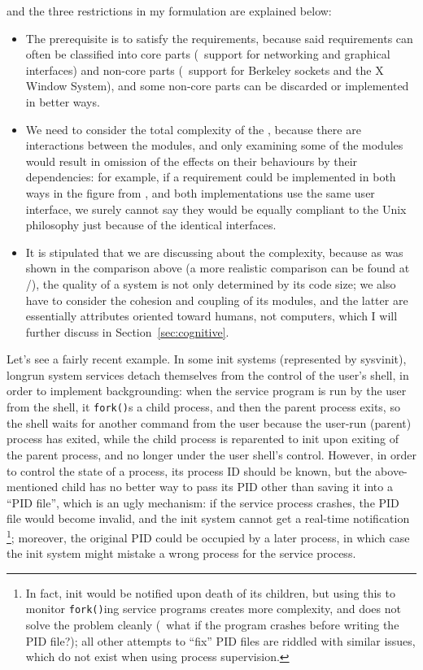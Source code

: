 and the three restrictions in my formulation are explained below:
\begin{itemize}
\item The prerequisite is to  satisfy the requirements,
	because said requirements can often be classified into core parts
	(\eg~support for networking and graphical interfaces) and non-core
	parts (\eg~support for Berkeley sockets and the X Window System),
	and some non-core parts can be discarded or implemented in better ways.
\item We need to consider the total complexity of the , because
	there are interactions between the modules, and only examining some of the
	modules would result in omission of the effects on their behaviours by
	their dependencies: for example, if a requirement could be implemented in	
	both ways in the figure from \parencite{litt2014a}, and both implementations
	use the same user interface, we surely cannot say they would be equally
	compliant to the Unix philosophy just because of the identical interfaces.
\item It is stipulated that we are discussing about the 
	complexity, because as was shown in the comparison above (a more realistic
	comparison can be found at \parencite{github:acmetiny}/\parencite%
	{gitea:emca}), the quality of a system is not only determined by its code
	size; we also have to consider the cohesion and coupling of its modules,
	and the latter are essentially attributes oriented toward humans, not
	computers, which I will further discuss in Section~\ref{sec:cognitive}.
\end{itemize}

Let's see a fairly recent example.  In some init systems (represented by
sysvinit), longrun system services detach themselves from the control of the
user's shell, in order to implement backgrounding:
when the service program is run by the user from the shell, it \verb|fork()|s a
child process, and then the parent process exits, so the shell waits for another
command from the user because the user-run (parent) process has exited, while
the child process is reparented to init upon exiting of the parent process, and
no longer under the user shell's control.  However, in order to control the
state of a process, its process ID should be known, but the above-mentioned
child has no better way to pass its PID other than saving it into a ``PID
file'', which is an ugly mechanism: if the service process crashes, the PID file
would become invalid, and the init system cannot get a real-time notification%
\footnote{In fact, init would be notified upon death of its children, but using
this to monitor \texttt{fork()}ing service programs creates more complexity,
and does not solve the problem cleanly (\eg~what if the program crashes before
writing the PID file?); all other attempts to ``fix'' PID files are riddled
with similar issues, which do not exist when using process supervision.};
moreover, the original PID could be occupied by a later process, in which
case the init system might mistake a wrong process for the service process.

